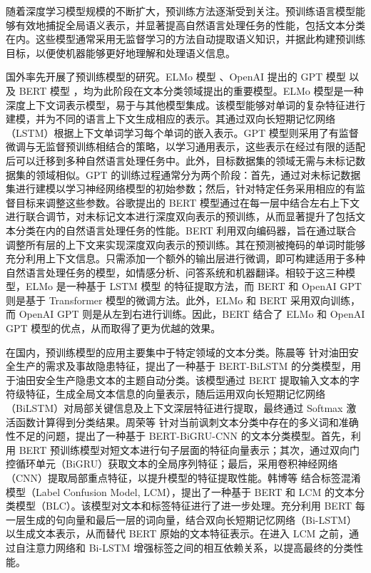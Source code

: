 
随着深度学习模型规模的不断扩大，预训练方法逐渐受到关注。预训练语言模型能够有效地捕捉全局语义表示，并显著提高自然语言处理任务的性能，包括文本分类在内。这些模型通常采用无监督学习的方法自动提取语义知识，并据此构建预训练目标，以便使机器能够更好地理解和处理语义信息。

国外率先开展了预训练模型的研究。ELMo 模型 \cite{Peters2018DeepCW}、OpenAI 提出的 GPT 模型 \cite{gpt} 以及 BERT 模型 \cite{devlin_bert_2019}，均为此阶段在文本分类领域提出的重要模型。ELMo 模型是一种深度上下文词表示模型，易于与其他模型集成。该模型能够对单词的复杂特征进行建模，并为不同的语言上下文生成相应的表示。其通过双向长短期记忆网络（LSTM）根据上下文单词学习每个单词的嵌入表示。GPT 模型则采用了有监督微调与无监督预训练相结合的策略，以学习通用表示，这些表示在经过有限的适配后可以迁移到多种自然语言处理任务中。此外，目标数据集的领域无需与未标记数据集的领域相似。GPT 的训练过程通常分为两个阶段：首先，通过对未标记数据集进行建模以学习神经网络模型的初始参数；然后，针对特定任务采用相应的有监督目标来调整这些参数。谷歌提出的 BERT 模型通过在每一层中结合左右上下文进行联合调节，对未标记文本进行深度双向表示的预训练，从而显著提升了包括文本分类在内的自然语言处理任务的性能。BERT 利用双向编码器，旨在通过联合调整所有层的上下文来实现深度双向表示的预训练。其在预测被掩码的单词时能够充分利用上下文信息。只需添加一个额外的输出层进行微调，即可构建适用于多种自然语言处理任务的模型，如情感分析、问答系统和机器翻译。相较于这三种模型，ELMo 是一种基于 LSTM 模型 \cite{LSTM} 的特征提取方法，而 BERT 和 OpenAI GPT 则是基于 Transformer 模型的微调方法。此外，ELMo 和 BERT 采用双向训练，而 OpenAI GPT 则是从左到右进行训练。因此，BERT 结合了 ELMo 和 OpenAI GPT 模型的优点，从而取得了更为优越的效果。

在国内，预训练模型的应用主要集中于特定领域的文本分类。陈晨等 \cite{KXJS202429028} 针对油田安全生产的需求及事故隐患特征，提出了一种基于 BERT-BiLSTM 的分类模型，用于油田安全生产隐患文本的主题自动分类。该模型通过 BERT 提取输入文本的字符级特征，生成全局文本信息的向量表示，随后运用双向长短期记忆网络（BiLSTM）对局部关键信息及上下文深层特征进行提取，最终通过 Softmax 激活函数计算得到分类结果。周荣等 \cite{DLXZ20240909001} 针对当前讽刺文本分类中存在的多义词和准确性不足的问题，提出了一种基于 BERT-BiGRU-CNN 的文本分类模型。首先，利用 BERT 预训练模型对短文本进行句子层面的特征向量表示；其次，通过双向门控循环单元（BiGRU）获取文本的全局序列特征；最后，采用卷积神经网络（CNN）提取局部重点特征，以提升模型的特征提取性能。韩博等 \cite{NJYD202403012} 结合标签混淆模型（Label Confusion Model, LCM），提出了一种基于 BERT 和 LCM 的文本分类模型（BLC）。该模型对文本和标签特征进行了进一步处理。充分利用 BERT 每一层生成的句向量和最后一层的词向量，结合双向长短期记忆网络（Bi-LSTM）以生成文本表示，从而替代 BERT 原始的文本特征表示。在进入 LCM 之前，通过自注意力网络和 Bi-LSTM 增强标签之间的相互依赖关系，以提高最终的分类性能。

